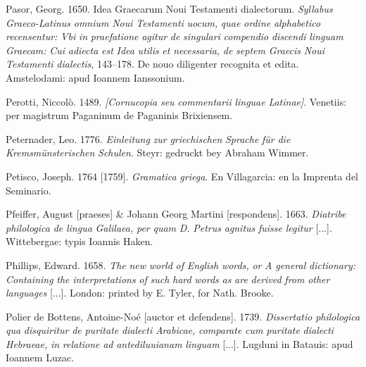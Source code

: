 Pasor, Georg. 1650. Idea Graecarum Noui Testamenti dialectorum. \textit{Syllabus} \textit{Graeco-Latinus} \textit{omnium} \textit{Noui} \textit{Testamenti} \textit{uocum,} \textit{quae} \textit{ordine} \textit{alphabetico} \textit{recensentur:} \textit{Vbi} \textit{in} \textit{praefatione} \textit{agitur} \textit{de} \textit{singulari} \textit{compendio} \textit{discendi} \textit{linguam} \textit{Graecam:} \textit{Cui} \textit{adiecta} \textit{est} \textit{Idea} \textit{utilis} \textit{et} \textit{necessaria,} \textit{de} \textit{septem} \textit{Graecis} \textit{Noui} \textit{Testamenti} \textit{dialectis}, 143–178. De nouo diligenter recognita et edita. Amstelodami: apud Ioannem Ianssonium.

Perotti, Niccolò. 1489. \textit{[Cornucopia} \textit{seu} \textit{commentarii} \textit{linguae} \textit{Latinae]}. Venetiis: per magistrum Paganinum de Paganinis Brixiensem.

Peternader, Leo. 1776. \textit{Einleitung} \textit{zur} \textit{griechischen} \textit{Sprache} \textit{für} \textit{die} \textit{Kremsmünsterischen} \textit{Schulen}. Steyr: gedruckt bey Abraham Wimmer.

Petisco, Joseph. 1764 [1759]. \textit{Gramatica} \textit{griega}. En Villagarcia: en la Imprenta del Seminario.

Pfeiffer, August [praeses] \& Johann Georg Martini [respondens]. 1663. \textit{Diatribe} \textit{philologica} \textit{de} \textit{lingua} \textit{Galilaea,} \textit{per} \textit{quam} \textit{D.} \textit{Petrus} \textit{agnitus} \textit{fuisse} \textit{legitur} [...]. Wittebergae: typis Ioannis Haken.

Phillips, Edward. 1658. \textit{The} \textit{new} \textit{world} \textit{of} \textit{English} \textit{words,} \textit{or} \textit{A} \textit{general} \textit{dictionary:} \textit{Containing} \textit{the} \textit{interpretations} \textit{of} \textit{such} \textit{hard} \textit{words} \textit{as} \textit{are} \textit{derived} \textit{from} \textit{other} \textit{languages} [...]. London: printed by E. Tyler, for Nath. Brooke.

Polier de Bottens, Antoine-Noé [auctor et defendens]. 1739. \textit{Dissertatio} \textit{philologica} \textit{qua} \textit{disquiritur} \textit{de} \textit{puritate} \textit{dialecti} \textit{Arabicae,} \textit{comparate} \textit{cum} \textit{puritate} \textit{dialecti} \textit{Hebraeae,} \textit{in} \textit{relatione} \textit{ad} \textit{antediluuianam} \textit{linguam} [...]. Lugduni in Batauis: apud Ioannem Luzac.

